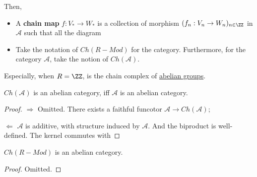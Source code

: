 \documentclass[Total.tex]{subfiles}
\begin{document}
				Then,
				\begin{Def}
					\begin{itemize}
						\item A \textbf{chain map} $f:V_*\rightarrow W_*$ is a collection of morphism $(f_n:V_n\rightarrow W_n)_{n\in \ZZ}$ in $\mathcal{A}$ such that all the diagram
						\begin{center}
						\end{center}
						\item Take the notation of $Ch(R-Mod)$ for the category. Furthermore, for the category $\mathcal{A}$, take the notion of $Ch(\mathcal{A})$.
					\end{itemize}
				\end{Def}
				Especially, when $R=\ZZ$, is the chain complex of \underline{abelian groups}.
				\begin{proposition}
					$Ch(\mathcal{A})$ is an abelian category, iff $\mathcal{A}$ is an abelian category.
				\end{proposition}
				\begin{proof}
					$\Rightarrow$ Omitted. There exists a faithful funcotor $\mathcal{A}\rightarrow Ch(\mathcal{A})$;
					
					$\Leftarrow$ $\mathcal{A}$ is additive, with structure induced by $\mathcal{A}$. And the biproduct is well-defined. The kernel commutes with 
				\end{proof}
				
				\begin{corollary}
					$Ch(R-Mod)$ is an abelian category.
				\end{corollary}
				\begin{proof}
					Omitted.
				\end{proof}
\end{document}
